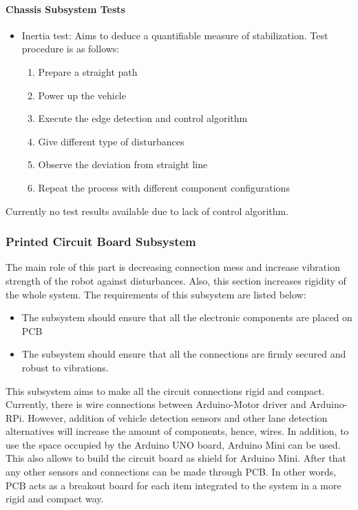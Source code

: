 \documentclass[a4paper,12pt]{article}
\begin{document}
	\paragraph{Chassis Subsystem Tests}
	\begin{itemize}
		\item Inertia test: Aims to deduce a quantifiable measure of stabilization. Test procedure is as follows:
		\begin{enumerate}
		\item Prepare a straight path
		\item Power up the vehicle 
		\item Execute the edge detection and control algorithm
		\item Give different type of disturbances 
		\item Observe the deviation from straight line
		\item Repeat the process with different component configurations
		\end{enumerate} 
	\end{itemize}
	Currently no test results available due to lack of control algorithm.
	\subsubsection{Printed Circuit Board Subsystem}
	The main role of this part is decreasing connection mess and increase vibration strength of the robot against disturbances. Also, this section increases rigidity of the whole system. The requirements of this subsystem are listed below:
	\begin{itemize}
		\item The subsystem should ensure that all the electronic components are placed on PCB
		\item The subsystem should ensure that all the connections are firmly secured and robust to vibrations.
	\end{itemize}
	
	This subsystem aims to make all the circuit connections rigid and compact. Currently, there is wire connections between Arduino-Motor driver and Arduino-RPi. However, addition of vehicle detection sensors and other lane detection alternatives will increase the amount of components, hence, wires. In addition, to use the space occupied by the Arduino UNO board, Arduino Mini can be used. This also allows to build the circuit board as shield for Arduino Mini. After that any other sensors and connections can be made through PCB. In other words, PCB acts as a breakout board for each item integrated to the system in a more rigid and compact way.
	
\end{document}
